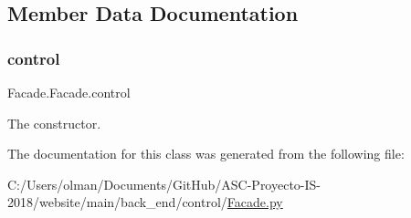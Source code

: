 \subsection{Member Data Documentation}
\mbox{\label{class_facade_1_1_facade_a4ec08f6f7094ff267875a3abc6f0cb1b}} 
\subsubsection{\texorpdfstring{control}{control}}
{\footnotesize\ttfamily Facade.\+Facade.\+control}



The constructor. 



The documentation for this class was generated from the following file\+:\begin{DoxyCompactItemize}
\item 
C\+:/\+Users/olman/\+Documents/\+Git\+Hub/\+A\+S\+C-\/\+Proyecto-\/\+I\+S-\/2018/website/main/back\+\_\+end/control/\mbox{\hyperlink{_facade_8py}{Facade.\+py}}\end{DoxyCompactItemize}
